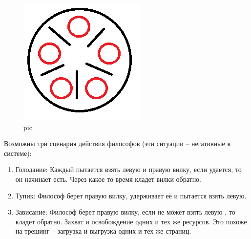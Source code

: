 \begin{figure}[H]
    \centering
    \includegraphics[width=\textwidth]{pic/1.png}
    \caption{pic}
\end{figure}

Возможны три сценария действия философов (эти ситуации – негативные в системе):
\begin{enumerate}
    \item Голодание: Каждый пытается взять левую и правую вилку, если удается, то он начинает есть. Через какое то время кладет вилки обратно.
    \item Тупик: Философ берет правую вилку, удерживает её и пытается взять левую.
    \item Зависание: Философ берет правую вилку, если не может взять левую , то кладет обратно. Захват и освобождение одних и тех же ресурсов. Это похоже на трешинг – загрузка и выгрузка одних и тех же страниц.
\end{enumerate} 


